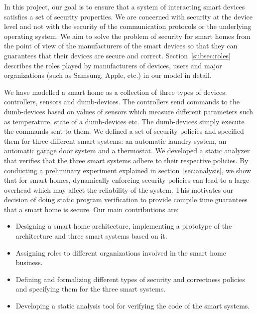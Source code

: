 \documentclass{article}
\begin{document}
In this project, our goal is to ensure that a system of interacting smart devices satisfies a set of security properties. We are concerned with security at the device level and not with the security of the communication protocols or the underlying operating system. We aim to solve the problem of security for smart homes from the point of view of the manufacturers of the smart devices so that they can guarantees that their devices are secure and correct. Section~\ref{subsec:roles} describes the roles played by manufacturers of devices, users and major organizations (such as Samsung, Apple, etc.) in our model in detail.

We have modelled a smart home as a collection of three types of devices: controllers, sensors and dumb-devices. The controllers send commands to the dumb-devices based on values of sensors which measure different parameters such as temperature, state of a dumb-devices etc. The dumb-devices simply execute the commands sent to them.
We defined a set of security policies and specified them for three different smart systems: an automatic laundry system, an automatic garage door system and a thermostat. We developed a static analyzer that verifies that the three smart systems adhere to their respective policies. By conducting a preliminary experiment explained in section~\ref{sec:analysis}, we show that for smart homes, dynamically enforcing security policies can lead to a large overhead which may affect the reliability of the system. This motivates our decision of doing static program verification to provide compile time guarantees that a smart home is secure. Our main contributions are:
\begin{itemize}[topsep=0pt,itemsep=0ex,partopsep=1ex,parsep=1ex]
    \item Designing a smart home architecture, implementing a prototype of the architecture and three smart systems based on it.
    \item Assigning roles to different organizations involved in the smart home business. 
    \item Defining and formalizing different types of security and correctness policies and specifying them for the three smart systems.
    \item Developing a static analysis tool for verifying the code of the smart systems.
\end{itemize}
  
\end{document}
